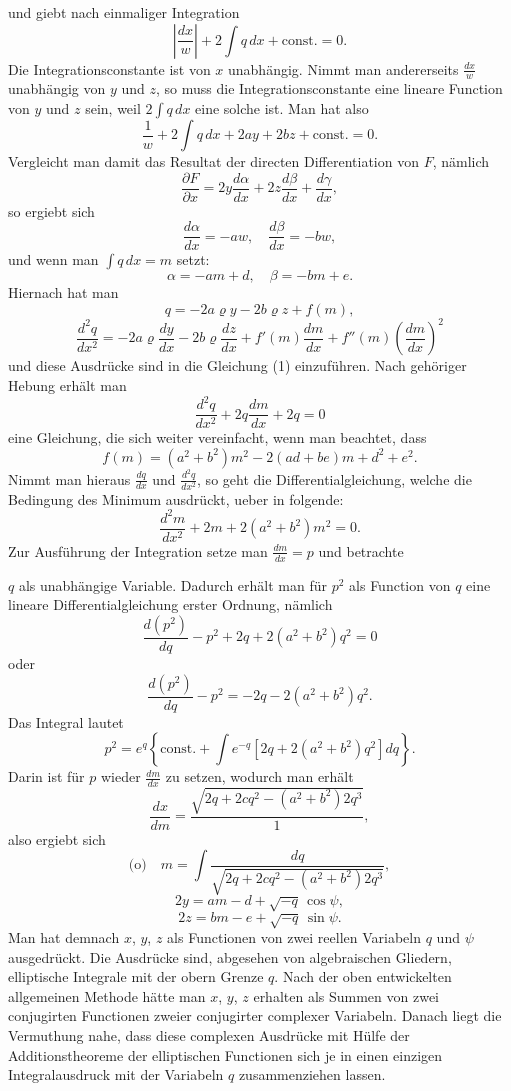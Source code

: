 \documentclass[12pt,a4paper]{article}
\begin{document}
und giebt nach einmaliger Integration
\[\left|\frac{dx}{w}\right| + 2\int q\, dx + \text{const.} = 0.\]
Die Integrationsconstante ist von $x$ unabh\"angig. Nimmt man andererseits $\frac{dx}{w}$ unabh\"angig von $y$ und $z$, so muss die Integrationsconstante eine lineare Function von $y$ und $z$ sein, weil $2\int q\, dx$ eine solche ist. Man hat also
\[\frac{1}{w} + 2\int q\, dx + 2ay + 2bz + \text{const.} = 0.\]
Vergleicht man damit das Resultat der directen Differentiation von $F$, n\"amlich
\[\frac{\partial F}{\partial x} = 2y \frac{d\alpha}{dx} + 2z \frac{d\beta}{dx} + \frac{d\gamma}{dx},\]
so ergiebt sich
\[\frac{d\alpha}{dx} = -aw, \quad \frac{d\beta}{dx} = -bw,\]
und wenn man $\int q\, dx = m$ setzt:
\[\alpha = -am + d, \quad \beta = -bm + e.\]
Hiernach hat man
\[q = -2a\varrho y - 2b\varrho z + f(m),\]
\[\frac{d^{2}q}{dx^{2}} = -2a\varrho \frac{dy}{dx} - 2b\varrho \frac{dz}{dx} + f'(m)\frac{dm}{dx} + f''(m)\left(\frac{dm}{dx}\right)^{2}\]
und diese Ausdr\"ucke sind in die Gleichung (1) einzuf\"uhren. Nach geh\"origer Hebung erh\"alt man
\[\frac{d^{2}q}{dx^{2}} + 2q \frac{dm}{dx} + 2q = 0\]
eine Gleichung, die sich weiter vereinfacht, wenn man beachtet, dass
\[f(m) = (a^{2} + b^{2})m^{2} - 2(ad + be)m + d^{2} + e^{2}.\]
Nimmt man hieraus $\frac{dq}{dx}$ und $\frac{d^{2}q}{dx^{2}}$, so geht die Differentialgleichung, welche die Bedingung des Minimum ausdr\"uckt, ueber in folgende:
\[\frac{d^{2}m}{dx^{2}} + 2m + 2(a^{2} + b^{2})m^{2} = 0.\]
Zur Ausf\"uhrung der Integration setze man $\frac{dm}{dx} = p$ und betrachte

\newpage
\noindent $q$ als unabh\"angige Variable. Dadurch erh\"alt man f\"ur $p^{2}$ als Function von $q$ eine lineare Differentialgleichung erster Ordnung, n\"amlich
\[\frac{d(p^{2})}{dq} - p^{2} + 2q + 2(a^{2} + b^{2})q^{2} = 0\]
oder
\[\frac{d(p^{2})}{dq} - p^{2} = -2q - 2(a^{2} + b^{2})q^{2}.\]
Das Integral lautet
\[p^{2} = e^{q} \left\{ \text{const.} + \int e^{-q} \left[2q + 2(a^{2} + b^{2})q^{2}\right] dq \right\}.\]
Darin ist f\"ur $p$ wieder $\frac{dm}{dx}$ zu setzen, wodurch man erh\"alt
\[\frac{dx}{dm} = \frac{\sqrt{2q + 2cq^{2} - (a^{2} + b^{2})2q^{3}}}{1},\]
also ergiebt sich
\[\text{(o)} \quad m = \int \frac{dq}{\sqrt{2q + 2cq^{2} - (a^{2} + b^{2})2q^{3}}},\]
\[2y = am - d + \sqrt{-q}\, \cos\psi,\]
\[2z = bm - e + \sqrt{-q}\, \sin\psi.\]
Man hat demnach $x$, $y$, $z$ als Functionen von zwei reellen Variabeln $q$ und $\psi$ ausgedr\"uckt. Die Ausdr\"ucke sind, abgesehen von algebraischen Gliedern, elliptische Integrale mit der obern Grenze $q$. Nach der oben entwickelten allgemeinen Methode h\"atte man $x$, $y$, $z$ erhalten als Summen von zwei conjugirten Functionen zweier conjugirter complexer Variabeln. Danach liegt die Vermuthung nahe, dass diese complexen Ausdr\"ucke mit H\"ulfe der Additionstheoreme der elliptischen Functionen sich je in einen einzigen Integralausdruck mit der Variabeln $q$ zusammenziehen lassen.
\end{document}
